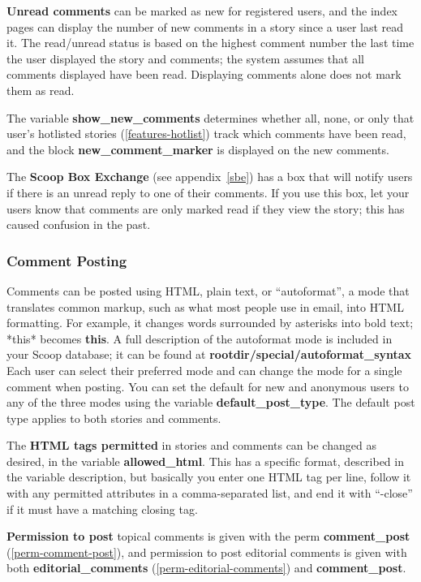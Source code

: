 {\bf Unread comments} can be marked as new for registered users, and the index pages can display the number of new comments in a story since a user last read it.  The read/unread status is based on the highest comment number the last time the user displayed the story and comments; the system assumes that all comments displayed have been read.  Displaying comments alone does not mark them as read.

The variable {\bf show\_new\_comments} determines whether all, none, or only that user's hotlisted stories (\ref{features-hotlist}) track which comments have been read, and the block {\bf new\_comment\_marker} is displayed on the new comments.

The {\bf Scoop Box Exchange} (see appendix~\ref{sbe}) has a box that will notify users if there is an unread reply to one of their comments.  If you use this box, let your users know that comments are only marked read if they view the story; this has caused confusion in the past.

\subsubsection{Comment Posting}
\label{comments-post}

Comments can be posted using HTML, plain text, or ``autoformat'', a mode that translates common markup, such as what most people use in email, into HTML formatting. For example, it changes words surrounded by asterisks into bold text; *this* becomes {\bf this}.  A full description of the autoformat mode is included in your Scoop database; it can be found at {\bf \latexhtml{$\vert$}{|}rootdir\latexhtml{$\vert$}{|}/special/autoformat\_syntax}  Each user can select their preferred mode and can change the mode for a single comment when posting.  You can set the default for new and anonymous users to any of the three modes using the variable {\bf default\_post\_type}.  The default post type applies to both stories and comments.

The {\bf HTML tags permitted} in stories and comments can be changed as desired, in the variable {\bf allowed\_html}.  This has a specific format, described in the variable description, but basically you enter one HTML tag per line, follow it with any permitted attributes in a comma-separated list, and end it with ``-close'' if it must have a matching closing tag.

{\bf Permission to post} topical comments is given with the perm {\bf comment\_post} (\ref{perm-comment-post}), and permission to post editorial comments is given with both {\bf editorial\_comments} (\ref{perm-editorial-comments}) and {\bf comment\_post}.  


